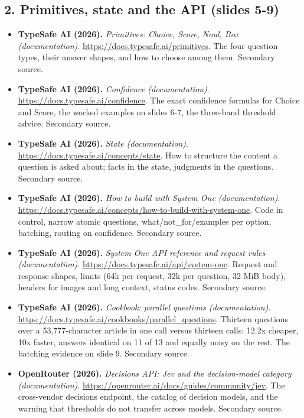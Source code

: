 \documentclass[11pt,letterpaper]{article}
\begin{document}
\subsection*{2. Primitives, state and the API (slides 5-9)}
\begin{itemize}[leftmargin=1.2em,itemsep=3pt]\sloppy
\item \textbf{TypeSafe AI (2026).} \textit{Primitives: Choice, Score, Noul, Box (documentation)}. \url{https://docs.typesafe.ai/primitives}. The four question types, their answer shapes, and how to choose among them. Secondary source.
\item \textbf{TypeSafe AI (2026).} \textit{Confidence (documentation)}. \url{https://docs.typesafe.ai/confidence}. The exact confidence formulas for Choice and Score, the worked examples on slides 6-7, the three-band threshold advice. Secondary source.
\item \textbf{TypeSafe AI (2026).} \textit{State (documentation)}. \url{https://docs.typesafe.ai/concepts/state}. How to structure the content a question is asked about; facts in the state, judgments in the questions. Secondary source.
\item \textbf{TypeSafe AI (2026).} \textit{How to build with System One (documentation)}. \url{https://docs.typesafe.ai/concepts/how-to-build-with-system-one}. Code in control, narrow atomic questions, what/not\_for/examples per option, batching, routing on confidence. Secondary source.
\item \textbf{TypeSafe AI (2026).} \textit{System One API reference and request rules (documentation)}. \url{https://docs.typesafe.ai/api/system-one}. Request and response shapes, limits (64k per request, 32k per question, 32 MiB body), headers for images and long context, status codes. Secondary source.
\item \textbf{TypeSafe AI (2026).} \textit{Cookbook: parallel questions (documentation)}. \url{https://docs.typesafe.ai/cookbooks/parallel_questions}. Thirteen questions over a 53,777-character article in one call versus thirteen calls: 12.2x cheaper, 10x faster, answers identical on 11 of 13 and equally noisy on the rest. The batching evidence on slide 9. Secondary source.
\item \textbf{OpenRouter (2026).} \textit{Decisions API: Jev and the decision-model category (documentation)}. \url{https://openrouter.ai/docs/guides/community/jev}. The cross-vendor decisions endpoint, the catalog of decision models, and the warning that thresholds do not transfer across models. Secondary source.

\end{itemize}
\end{document}
